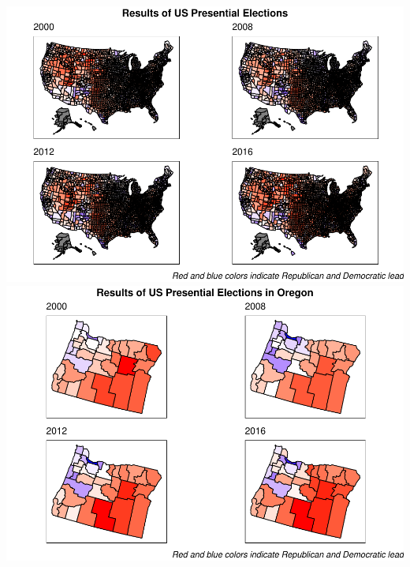 \documentclass[
  english,
  man]{apa6}
\begin{document}
\includegraphics{Script_files/figure-latex/visualization election results-1.pdf} \includegraphics{Script_files/figure-latex/visualization election results-2.pdf}
\end{document}
